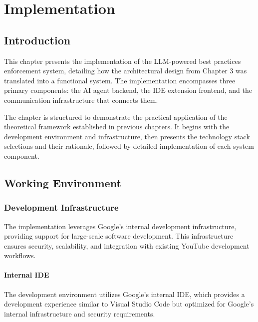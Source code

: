 \setcounter{chapter}{3}
\chapter{Implementation}
\minitoc %
\graphicspath{{Chapitre4/figures/}}

\pagestyle{fancy}
\fancyhf{}
\fancyhead[R]{\bfseries\rightmark}
\fancyfoot[R]{\thepage}
\renewcommand{\headrulewidth}{0.5pt}
\renewcommand{\footrulewidth}{0pt}
\renewcommand{\chaptermark}[1]{\markboth{{\chaptername~\thechapter. #1 }}{}}
\renewcommand{\sectionmark}[1]{\markright{\thechapter.\thesection~ #1}}

\begin{spacing}{1.2}

\section*{Introduction}
This chapter presents the implementation of the LLM-powered best practices enforcement system, detailing how the architectural design from Chapter 3 was translated into a functional system. The implementation encompasses three primary components: the AI agent backend, the IDE extension frontend, and the communication infrastructure that connects them.

The chapter is structured to demonstrate the practical application of the theoretical framework established in previous chapters. It begins with the development environment and infrastructure, then presents the technology stack selections and their rationale, followed by detailed implementation of each system component.

\section{Working Environment}

\subsection{Development Infrastructure}
The implementation leverages Google's internal development infrastructure, providing support for large-scale software development. This infrastructure ensures security, scalability, and integration with existing YouTube development workflows.

\subsubsection{Internal IDE}
The development environment utilizes Google's internal IDE, which provides a development experience similar to Visual Studio Code but optimized for Google's internal infrastructure and security requirements.


\end{spacing}
